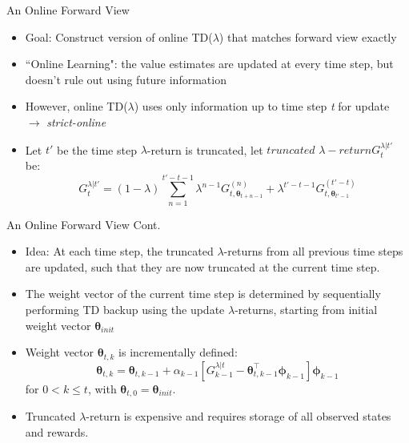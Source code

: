 \documentclass[xcolor={table}]{beamer}
\begin{document}
\begin{frame}{An Online Forward View}
    \begin{itemize}
        \item Goal: Construct version of online TD($\lambda$) that matches forward view exactly
        \item ``Online Learning": the value estimates are updated at every time step, but doesn't rule out using future information
        \item However, online TD($\lambda$) uses only information up to
        time step \textit{t} for update $\rightarrow$ \textit{strict-online}
        \item Let $t'$ be the time step $\lambda$-return is truncated, let $truncated$ $\lambda-return G_{t}^{\lambda|t'}$ be:
        \begin{equation*}
            G_{t}^{\lambda|t'} = (1-\lambda)\sum_{n=1}^{t'-t-1}\lambda^{n-1}G_{t,\boldsymbol{\theta}_{t+n-1}}^{(n)} + \lambda^{t'-t-1}G_{t,\boldsymbol{\theta}_{t'-1}}^{(t'-t)}
        \end{equation*}
    \end{itemize}
\end{frame}

\begin{frame}{An Online Forward View Cont.}
    \begin{itemize}
        \item Idea: At each time step, the truncated $\lambda$-returns from all previous time steps are updated, such that they are now truncated at the current time step.
        \item The weight vector of the current time step is determined by sequentially performing TD backup using the update $\lambda$-returns, starting from initial weight vector $\boldsymbol{\theta}_{init}$
        \item Weight vector $\boldsymbol{\theta}_{t,k}$ is incrementally defined:
        \begin{equation*}
            \boldsymbol{\theta}_{t,k} = \boldsymbol{\theta}_{t,k-1} + \alpha_{k-1}\left [ G_{k-1}^{\lambda|t} - \boldsymbol{\theta}_{t,k-1}^{\top}\boldsymbol{\phi}_{k-1}\right ]\boldsymbol{\phi}_{k-1}
        \end{equation*}
        for $0 < k \leq t$, with $\boldsymbol{\theta}_{t,0} = \boldsymbol{\theta}_{init}$.
        \item Truncated $\lambda$-return is expensive and requires storage of all observed states and rewards.
    \end{itemize}
\end{frame}
\end{document}
